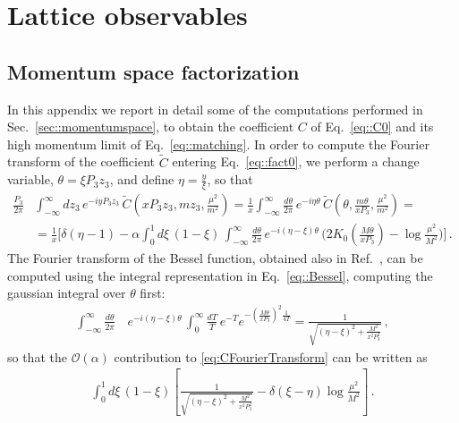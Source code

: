 \chapter{Lattice observables}

\section{Momentum space factorization}
\label{app:plus}

In this appendix we report in detail some of the computations performed in
Sec.~\ref{sec::momentumspace}, to obtain the coefficient $C$ of
Eq.~\eqref{eq::C0} and its high momentum limit of Eq.~\eqref{eq::matching}. In
order to compute the Fourier transform of the coefficient $\tilde{C}$ entering
Eq.~\eqref{eq::fact0}, we perform a change variable, $\theta = \xi P_3 z_3 $,
and define $\eta = \frac{y}{\xi}$, so that
\begin{align}
    \frac{P_3}{2\pi} 
    & \int_{-\infty}^{\infty} dz_3\,
        e^{-i y P_3 z_3}\,
        \tilde{C}\left(x P_3 z_3, m z_3, \frac{\mu^2}{m^2} \right)
        = \frac{1}{x} \int_{-\infty}^{\infty} \frac{d\theta}{2\pi}\,
        e^{-i \eta \theta}\,
        \tilde{C}\left(\theta, \frac{m \theta}{x P_3}, \frac{\mu^2}{m^2} \right)
        = \nonumber\\
    \label{eq:CFourierTransform}
    &= \frac{1}{x} \biggl[
        \delta\left(\eta-1\right) - \alpha \int_0^1 d\xi\, \left(1-\xi\right)\,
        \int_{-\infty}^{\infty} \frac{d\theta}{2\pi}\, 
        e^{-i \left(\eta-\xi\right) \theta} \,
        \biggl(2 K_0\left(\frac{M\theta}{x P_3}\right)
        -\log\frac{\mu^2}{M^2}\biggr)\biggr]\, .
\end{align}
The Fourier transform of the Bessel function, obtained also in Ref.~\cite{Radyushkin:2016hsy}, can be computed using the integral
representation in Eq.~\eqref{eq::Bessel}, computing the gaussian integral over
$\theta$ first:
\begin{align}
    \int_{-\infty}^{\infty} \frac{d\theta}{2\pi}\,
    & e^{-i \left(\eta-\xi\right)\theta}\,
    \int_0^{\infty} \frac{dT}{T}\, e^{-T} 
    e^{-\left(\frac{M\theta}{x P_3}\right)^2 \frac{1}{4T}} 
    =  \frac{1}{\sqrt{\left(\eta - \xi\right)^2 + \frac{M^2}{x^2 P_3^2}}}\, ,
\end{align}
so that the $\mathcal{O}(\alpha)$ contribution to \eqref{eq:CFourierTransform}
can be written as 
\begin{align}
    \label{eq::appC0}
    \int_0^1 d\xi\,
    \left(1-\xi\right) 
    \left[ \frac{1}{\sqrt{\left(\eta-\xi\right)^2 + \frac{M^2}{x^2P_3^2}}} 
    - \delta\left(\xi-\eta\right) \log\frac{\mu^2}{M^2}\right]\, .
\end{align}

